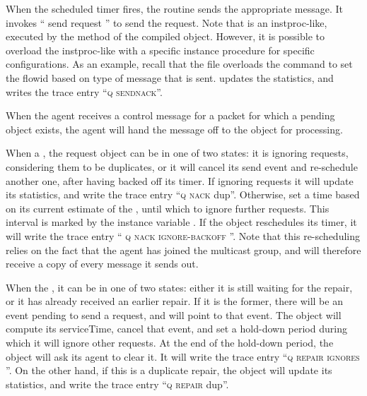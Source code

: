 When the scheduled timer fires, the routine
sends the appropriate message.
It invokes `` send request '' to send the request.
Note that  is an instproc-like,
executed by the  method of the compiled object.
However, it is possible to overload the instproc-like
with a specific instance procedure 
for specific configurations.
As an example, recall that the file 
overloads the  command
to set the flowid based on type of message that is sent.
 updates the statistics, and writes the trace entry
``\textsc{q sendnack}''.

When the agent receives a control message for a packet
for which a pending object exists,
the agent will hand the message off to the object for processing.
\begin{list}{}{}
\item When a 
  ,
  the request object can be in one of two states:
  it is ignoring requests, considering them to be duplicates, or
  it will cancel its send event and re-schedule another one,
  after having backed off its timer.
  If ignoring requests it will update its statistics,
  and write the trace entry ``\textsc{q nack } dup''.
  Otherwise, set a time based on its current estimate of the ,
  until which to ignore further requests.
  This interval is marked by the instance variable .
  If the object reschedules its timer, it will write the trace entry
  ``\textsc{ q nack ignore-backoff } ''.
  Note that this re-scheduling relies on the fact that
  the agent has joined the multicast group, and will therefore
  receive a copy of every message it sends out.
  
\item When the
  ,
  it can be in one of two states:
  either it is still waiting for the repair,
  or it has already received an earlier repair.
  If it is the former, there will be an event pending
  to send a request, and  will point to that event.
  The object will compute its serviceTime, cancel that event,
  and set a hold-down period during which it will ignore 
  other requests.
  At the end of the hold-down period, the object will ask its
  agent to clear it.
  It will write the trace entry ``\textsc{q repair ignores } ''.
  On the other hand, if this is a duplicate repair,
  the object will update its statistics, and write the trace entry
  ``\textsc{q repair } dup''.
\end{list}

